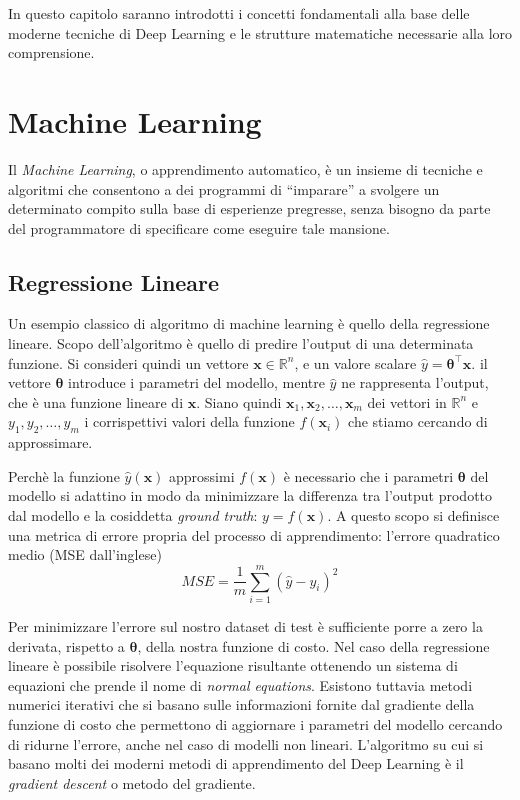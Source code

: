\documentclass{standalone}
\begin{document}
In questo capitolo saranno introdotti i concetti fondamentali alla base delle
moderne tecniche di Deep Learning e le strutture matematiche necessarie alla
loro comprensione. \\

\section{Machine Learning}
Il \emph{Machine Learning}, o apprendimento automatico, è un insieme di
tecniche e algoritmi che consentono a dei programmi di ``imparare'' a svolgere
un determinato compito sulla base di esperienze pregresse, senza bisogno da
parte del programmatore di specificare come eseguire tale mansione. 
\subsection{Regressione Lineare}
Un esempio classico di algoritmo di machine learning è quello della regressione
lineare. Scopo dell'algoritmo è quello di predire l'output di una determinata
funzione.  Si consideri quindi un vettore $ \bm x \in \mathbb{R}^n $, e
un valore scalare $\hat{y} = \bm \theta^\intercal \bm x$. il
vettore $\bm \theta$ introduce i parametri del modello, mentre
$\hat{y}$ ne rappresenta l'output, che è una funzione lineare di $\bm
x$. Siano quindi $ \bm x_1, \bm x_2, \dotsc, \bm x_m $ dei vettori in
$\mathbb{R}^n$ e  $ y_1, y_2, \dotsc, y_m $ i corrispettivi valori della
funzione $f(\bm x_i)$ che stiamo cercando di approssimare.

Perchè la funzione $\hat{y}(\bm x)$ approssimi $f(\bm x)$ è necessario che i
parametri $\bm \theta$ del modello si adattino in modo da minimizzare la differenza
tra l'output prodotto dal modello e la cosiddetta \emph{ground truth}: $y =
f(\bm x)$. A questo scopo si definisce una metrica di errore propria del
processo di apprendimento: l'errore quadratico medio (MSE dall'inglese) 
$$MSE = \frac{1}{m} \sum_{i=1}^m{(\hat{y} - y_i)^2}$$

Per minimizzare l'errore sul nostro dataset di test è sufficiente porre a zero
la derivata, rispetto a $\bm \theta$, della nostra funzione di costo. Nel caso
della regressione lineare è possibile risolvere l'equazione risultante
ottenendo un sistema di equazioni che prende il nome di 
\emph{normal equations}.
Esistono tuttavia metodi numerici iterativi che si basano sulle informazioni
fornite dal gradiente della funzione di costo che permettono di aggiornare i
parametri del modello cercando di ridurne l'errore, anche nel caso di modelli
non lineari. L'algoritmo su cui si basano molti dei moderni metodi di
apprendimento del Deep Learning è il \emph{gradient descent} o metodo del
gradiente.
\end{document}
